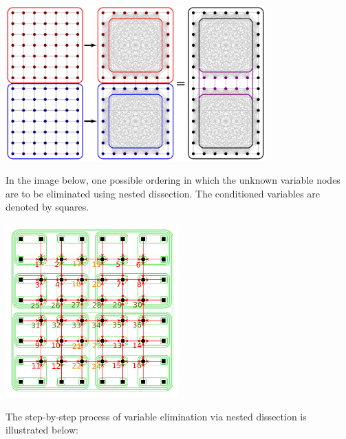 \documentclass{article}
\begin{document}
\begin{center}
\includegraphics[width = 0.75\textwidth]{node_clusters_private_interior}
\end{center}

In the image below, one possible ordering in which the unknown variable nodes are to be eliminated using nested dissection. The conditioned variables are denoted by squares. 

\begin{center}
\includegraphics[width = 0.5\textwidth]{example_nested_dissection/example_nested_dissection_elimination_order_no_boundary}
\end{center}

The step-by-step process of variable elimination via nested dissection is illustrated below: 
\end{document}
